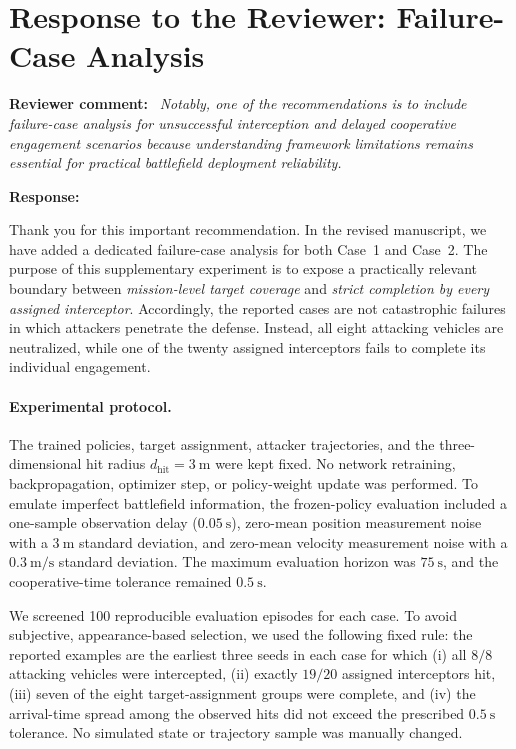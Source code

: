 \documentclass[10pt]{article}
\newcommand{\reviewercomment}[1]{%
  \noindent\textbf{\textcolor{reviewerblue}{Reviewer comment:}}%
  \ \textit{#1}\par
}
\newcommand{\authorresponse}{%
  \noindent\textbf{\textcolor{responseblue}{Response:}}\ %
}
\begin{document}
\section*{Response to the Reviewer: Failure-Case Analysis}

\reviewercomment{Notably, one of the recommendations is to include
failure-case analysis for unsuccessful interception and delayed cooperative
engagement scenarios because understanding framework limitations remains
essential for practical battlefield deployment reliability.}

\authorresponse
Thank you for this important recommendation. In the revised manuscript, we
have added a dedicated failure-case analysis for both Case~1 and Case~2. The
purpose of this supplementary experiment is to expose a practically relevant
boundary between \emph{mission-level target coverage} and \emph{strict
completion by every assigned interceptor}. Accordingly, the reported cases are
not catastrophic failures in which attackers penetrate the defense. Instead,
all eight attacking vehicles are neutralized, while one of the twenty assigned
interceptors fails to complete its individual engagement.

\paragraph{Experimental protocol.}
The trained policies, target assignment, attacker trajectories, and the
three-dimensional hit radius \(d_{\mathrm{hit}}=3~\mathrm{m}\) were kept
fixed. No network retraining, backpropagation, optimizer step, or policy-weight
update was performed. To emulate imperfect battlefield information, the
frozen-policy evaluation included a one-sample observation delay
(\(0.05~\mathrm{s}\)), zero-mean position measurement noise with a
\(3~\mathrm{m}\) standard deviation, and zero-mean velocity measurement noise
with a \(0.3~\mathrm{m/s}\) standard deviation. The maximum evaluation horizon
was \(75~\mathrm{s}\), and the cooperative-time tolerance remained
\(0.5~\mathrm{s}\).

We screened 100 reproducible evaluation episodes for each case. To avoid
subjective, appearance-based selection, we used the following fixed rule: the
reported examples are the earliest three seeds in each case for which
(i) all \(8/8\) attacking vehicles were intercepted,
(ii) exactly \(19/20\) assigned interceptors hit,
(iii) seven of the eight target-assignment groups were complete, and
(iv) the arrival-time spread among the observed hits did not exceed the
prescribed \(0.5~\mathrm{s}\) tolerance. No simulated state or trajectory
sample was manually changed.
\end{document}
